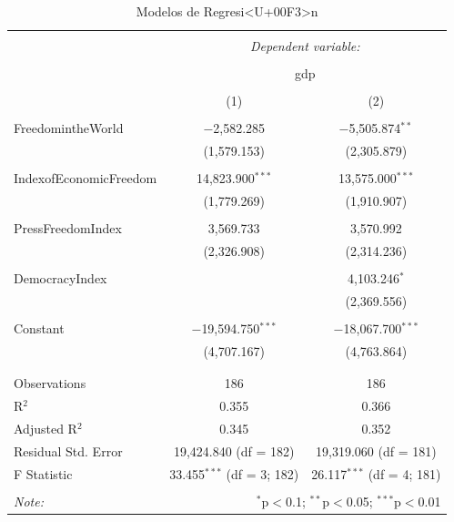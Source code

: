 \documentclass{article}
\begin{document}
\begin{table}[!htbp] \centering 
  \caption{Modelos de Regresi<U+00F3>n} 
  \label{regresiones} 
\begin{tabular}{@{\extracolsep{5pt}}lcc} 
\\[-1.8ex]\hline 
\hline \\[-1.8ex] 
 & \multicolumn{2}{c}{\textit{Dependent variable:}} \\ 
\cline{2-3} 
\\[-1.8ex] & \multicolumn{2}{c}{gdp} \\ 
\\[-1.8ex] & (1) & (2)\\ 
\hline \\[-1.8ex] 
 FreedomintheWorld & $-$2,582.285 & $-$5,505.874$^{**}$ \\ 
  & (1,579.153) & (2,305.879) \\ 
  & & \\ 
 IndexofEconomicFreedom & 14,823.900$^{***}$ & 13,575.000$^{***}$ \\ 
  & (1,779.269) & (1,910.907) \\ 
  & & \\ 
 PressFreedomIndex & 3,569.733 & 3,570.992 \\ 
  & (2,326.908) & (2,314.236) \\ 
  & & \\ 
 DemocracyIndex &  & 4,103.246$^{*}$ \\ 
  &  & (2,369.556) \\ 
  & & \\ 
 Constant & $-$19,594.750$^{***}$ & $-$18,067.700$^{***}$ \\ 
  & (4,707.167) & (4,763.864) \\ 
  & & \\ 
\hline \\[-1.8ex] 
Observations & 186 & 186 \\ 
R$^{2}$ & 0.355 & 0.366 \\ 
Adjusted R$^{2}$ & 0.345 & 0.352 \\ 
Residual Std. Error & 19,424.840 (df = 182) & 19,319.060 (df = 181) \\ 
F Statistic & 33.455$^{***}$ (df = 3; 182) & 26.117$^{***}$ (df = 4; 181) \\ 
\hline 
\hline \\[-1.8ex] 
\textit{Note:}  & \multicolumn{2}{r}{$^{*}$p$<$0.1; $^{**}$p$<$0.05; $^{***}$p$<$0.01} \\ 
\end{tabular} 
\end{table} 
\clearpage
\end{document}
